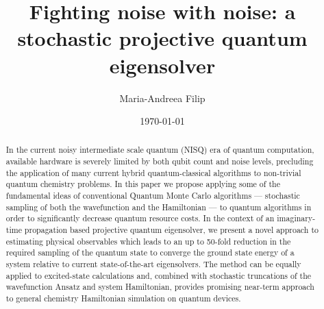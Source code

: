 \documentclass[%
 reprint,
 amsmath,amssymb,
 aps,
]{revtex4-2}
\begin{document}
\title{Fighting noise with noise: a stochastic projective quantum eigensolver}
\author{Maria-Andreea Filip}  

% 
% 
\date{\today}%

\begin{abstract}

In the current noisy intermediate scale quantum (NISQ) era of quantum computation, available hardware is severely limited by both qubit count and noise levels, precluding the application of many current hybrid quantum-classical algorithms to non-trivial quantum chemistry problems. In this paper we propose applying some of the fundamental ideas of conventional Quantum Monte Carlo algorithms --- stochastic sampling of both the wavefunction and the Hamiltonian --- to quantum algorithms in order to significantly decrease quantum resource costs. In the context of an imaginary-time propagation based projective quantum eigensolver, we present a novel approach to estimating physical observables which leads to an up to 50-fold reduction in the required sampling of the quantum state to converge the ground state energy of a system relative to current state-of-the-art eigensolvers. The method can be equally applied to excited-state calculations and, combined with stochastic truncations of the wavefunction Ansatz and system Hamiltonian, provides promising near-term approach to general chemistry Hamiltonian simulation on quantum devices.
\end{abstract}
\maketitle
\end{document}

